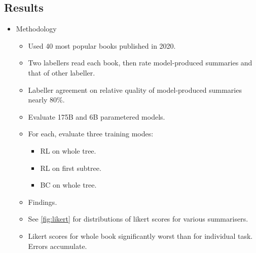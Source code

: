 \subsection{Results}

\begin{itemize}
    \item Methodology
    \begin{itemize}
        \item Used 40 most popular books published in 2020.
        \item Two labellers read each book, then rate model-produced summaries and that of other labeller.
        \item Labeller agreement on relative quality of model-produced summaries nearly 80\%.
        \item Evaluate 175B and 6B parametered models.
        \item For each, evaluate three training modes:
        \begin{itemize}
            \item RL on whole tree.
            \item RL on first subtree.
            \item BC on whole tree.
        \end{itemize}
        \item Findings.
    \end{itemize}
    \begin{itemize}
        \item See \cref{fig:likert} for distributions of likert scores for various summarisers.
        \item Likert scores for whole book significantly worst than for individual task. Errors accumulate.
    \end{itemize}
\end{itemize}


